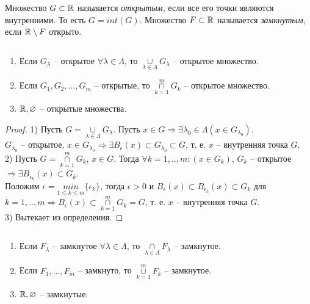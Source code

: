     \begin{definition}
        Множество $G \subset \mathbb{R}$ называется \textit{открытым}, если все его точки являются внутренними. То есть $G = int(G)$.
        Множество $F \subset \mathbb{R}$ называется \textit{замкнутым}, если $\mathbb{R} \setminus F$ открыто.
    \end{definition}
    
    \begin{lemma}
        $\text{}$
        \begin{enumerate}
            \item Если $G_{\lambda}$ -- открытое $\forall \lambda \in \Lambda$, то $\underset{\lambda \in \Lambda}{\cup} G_{\lambda}$ -- открытое множество.
            \item Если $G_{1}, G_{2}, ..., G_{m}$ -- открытые, то $\overset{m}{\underset{k = 1}{\cap}} G_{k}$ -- открытое множество.
            \item $\mathbb{R}, \varnothing$ -- открытые множества.
        \end{enumerate}
    \end{lemma}
    
    \begin{proof}
        1) Пусть $G = \underset{\lambda \in \Lambda}{\cup} G_{\lambda}$. Пусть $x \in G \Rightarrow \exists \lambda_{0} \in \Lambda (x \in G_{\lambda_0})$.
        \\
        $G_{\lambda_0}$ -- открытое, $x \in G_{\lambda_0} \Rightarrow \exists B_{\epsilon}(x) \subset G_{\lambda_0} \subset G$, т. е. $x$ -- внутренняя точка $G$.
        \\
        2) Пусть $G = \overset{m}{\underset{k = 1}{\cap}} G_{k}$, $x \in G$. Тогда $\forall k = 1, .., m: (x \in G_{k})$, $G_k$ -- открытое $\Rightarrow \exists B_{\epsilon_{k}} (x) \subset G_{k}$.
        \\
        Положим $\epsilon = \underset{1 \leq k \leq m}{min}\{\epsilon_{k}\}$, тогда $\epsilon > 0$ и $B_{\epsilon}(x) \subset B_{\epsilon_{k}}(x) \subset G_{k}$ для $k = 1, .., m \Rightarrow B_{\epsilon}(x) \subset \overset{m}{\underset{k = 1}{\cap}} G_{k} = G$, т. е. $x$ -- внутренняя точка $G$.
        \\
        3) Вытекает из определения.
    \end{proof}
    
    \begin{lemma}
        $\text{}$
        \begin{enumerate}
            \item Если $F_{\lambda}$ -- замкнутое $\forall \lambda \in \Lambda$, то $\underset{\lambda \in \Lambda}{\cap} F_{\lambda}$ -- замкнутое.
            \item Если $F_{1}, ..., F_{m}$ -- замкнуто, то $\overset{m}{\underset{k = 1}{\cup}} F_{k}$ -- замкнутое.
            \item $\mathbb{R}, \varnothing$ -- замкнутые.
        \end{enumerate}
    \end{lemma}
    
